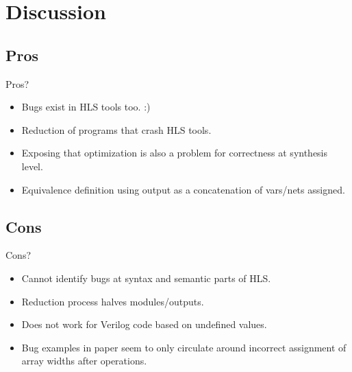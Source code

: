 \documentclass[xcolor=dvipsnames]{beamer}
\begin{document}

    \section{Discussion}
    \subsection{Pros}
    \begin{frame}{Pros?}
        
        \begin{itemize}
            \item Bugs exist in HLS tools too. :)
            \item Reduction of programs that crash HLS tools. 
            \item Exposing that optimization is also a problem for correctness at synthesis level. 
            \item Equivalence definition using output as a concatenation of vars/nets assigned. 
        \end{itemize}

    \end{frame}

    \subsection{Cons}
    \begin{frame}{Cons?}
        
        \begin{itemize}
            \item Cannot identify bugs at syntax and semantic parts of HLS. 
            \item Reduction process halves modules/outputs. 
            \item Does not work for Verilog code based on undefined values. 
            \item Bug examples in paper seem to only circulate around incorrect assignment of array widths after operations. 
        \end{itemize}

    \end{frame}
\end{document}
